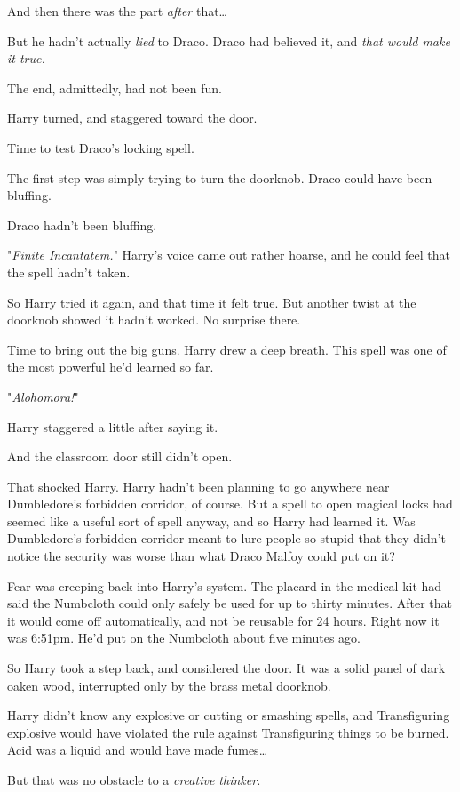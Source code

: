 And then there was the part \emph{after} that…

But he hadn't actually \emph{lied} to Draco. Draco had believed it, and
\emph{that would make it true.}

The end, admittedly, had not been fun.

Harry turned, and staggered toward the door.

Time to test Draco's locking spell.

The first step was simply trying to turn the doorknob. Draco could have been
bluffing.

Draco hadn't been bluffing.

"\emph{Finite Incantatem.}" Harry's voice came out rather hoarse, and he could
feel that the spell hadn't taken.

So Harry tried it again, and that time it felt true. But another twist at the
doorknob showed it hadn't worked. No surprise there.

Time to bring out the big guns. Harry drew a deep breath. This spell was one of
the most powerful he'd learned so far.

"\emph{Alohomora!}"

Harry staggered a little after saying it.

And the classroom door still didn't open.

That shocked Harry. Harry hadn't been planning to go anywhere near Dumbledore's
forbidden corridor, of course. But a spell to open magical locks had seemed
like a useful sort of spell anyway, and so Harry had learned it. Was
Dumbledore's forbidden corridor meant to lure people so stupid that they didn't
notice the security was worse than what Draco Malfoy could put on it?

Fear was creeping back into Harry's system. The placard in the medical kit had
said the Numbcloth could only safely be used for up to thirty minutes. After
that it would come off automatically, and not be reusable for 24 hours. Right
now it was 6:51pm. He'd put on the Numbcloth about five minutes ago.

So Harry took a step back, and considered the door. It was a solid panel of
dark oaken wood, interrupted only by the brass metal doorknob.

Harry didn't know any explosive or cutting or smashing spells, and
Transfiguring explosive would have violated the rule against Transfiguring
things to be burned. Acid was a liquid and would have made fumes…

But that was no obstacle to a \emph{creative thinker.}

